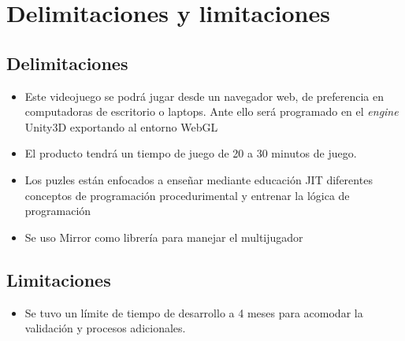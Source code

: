 \section{Delimitaciones y limitaciones}
\subsection{Delimitaciones}
\begin{itemize}
    \item Este videojuego se podrá jugar desde un navegador web, de preferencia en computadoras de escritorio o laptops. Ante ello será programado en el \textit{engine} Unity3D exportando al entorno WebGL
    \item El producto tendrá un tiempo de juego de 20 a 30 minutos de juego.
    \item Los puzles están enfocados a enseñar mediante educación JIT diferentes conceptos de programación procedurimental y entrenar la lógica de programación
    \item Se uso Mirror como librería para manejar el multijugador
\end{itemize}
\subsection{Limitaciones}
\begin{itemize}
    \item Se tuvo un límite de tiempo de desarrollo a 4 meses para acomodar la validación y
procesos adicionales.

\end{itemize}
